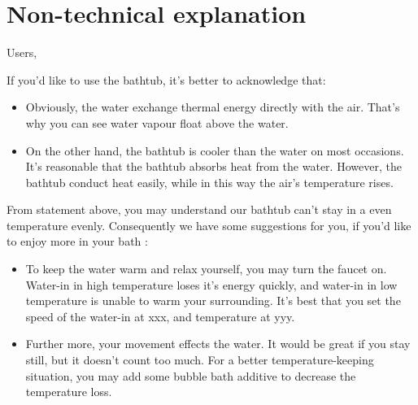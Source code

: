 \documentclass[12pt,a4paper,titlepage]{article}
\begin{document}
\begin{thebibliography}{99}

\bibitem{}

\end{thebibliography}

\label{LastPage}

\section{Non-technical explanation}

Users,

If you'd like to use the bathtub, it's better to acknowledge that:

\begin{itemize}
\item Obviously, the water exchange thermal energy directly with the air. That's why you can see water vapour float above the water.
\item On the other hand, the bathtub is cooler than the water on most occasions. It's reasonable that the bathtub absorbs heat from the water. However, the bathtub conduct heat easily, while in this way the air's temperature rises.
\end{itemize}
From statement above, you may understand our bathtub can't stay in a even temperature evenly. Consequently we have some suggestions for you, if you'd like to enjoy more in your bath :
\begin{itemize}
\item To keep the water warm and relax yourself, you may turn the faucet on. Water-in in high temperature loses it's energy quickly, and water-in in low temperature is unable to warm your surrounding. It's best that you set the speed of the water-in at xxx, and temperature at yyy.
\item Further more, your movement effects the water. It would be great if you stay still, but it doesn't count too much. For a better temperature-keeping situation, you may add some bubble bath additive to decrease the temperature loss.
\end{itemize}
\end{document}
